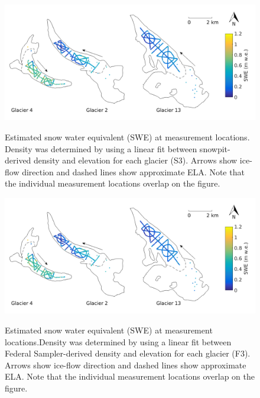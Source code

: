 \documentclass{sfuthesis}
\begin{document}
\begin{figure}[H]
	\centering
	\includegraphics[width = \textwidth]{SWEmap_opt6.png}\\
	\caption{Estimated snow water equivalent (SWE) at measurement locations. Density was determined by using a linear fit between snowpit-derived density and elevation for each glacier (S3). Arrows show ice-flow direction and dashed lines show approximate ELA. Note that the individual measurement locations overlap on the figure.}
	\label{fig:SWEmap_S3}
\end{figure}

\begin{figure}[H]
	\centering
	\includegraphics[width = \textwidth]{SWEmap_opt7.png}\\
	\caption{Estimated snow water equivalent (SWE) at measurement locations.Density was determined by using a linear fit between Federal Sampler-derived density and elevation for each glacier (F3). Arrows show ice-flow direction and dashed lines show approximate ELA. Note that the individual measurement locations overlap on the figure.}
	\label{fig:SWEmap_F3}
\end{figure}
\end{document}
